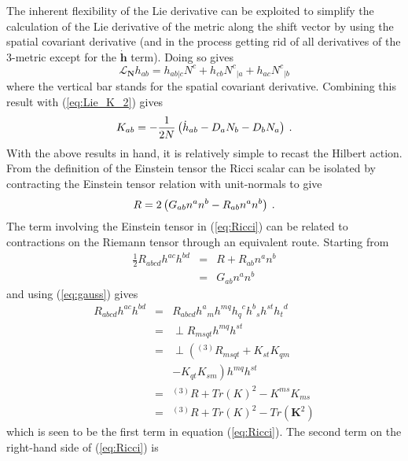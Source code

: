 The inherent flexibility of the Lie derivative can be exploited to simplify the
calculation of the Lie derivative of the metric along the shift vector by
using the spatial covariant derivative (and in the process getting rid of all
derivatives of the 3-metric except for the $\mathbf{\dot h}$ term).
Doing so gives
\[
   {\mathcal L}_{\mathbf{N}} h_{ab} = h_{ab|c} N^c + h_{cb} {N^{c}}_{|a}
                                                  + h_{ac} {N^{c}}_{|b}
\]
where the vertical bar stands for the spatial covariant derivative.  Combining
this result with (\ref{eq:Lie_K_2}) gives
\[
   K_{ab} = -\frac{1}{2 N} \left( {\dot h}_{ab} - D_{a} N_{b} - D_{b} N_{a} \right) \: .
\]
With the above results in hand, it is relatively simple to recast the Hilbert
action.  From the definition of the Einstein tensor the Ricci scalar can be
isolated by contracting the Einstein tensor relation with unit-normals to give
\begin{equation}\label{eq:Ricci}
   R = 2 \left( G_{ab}n^an^b - R_{ab} n^a n^b \right) \: .
\end{equation}
The term involving the Einstein tensor in (\ref{eq:Ricci}) can be related to
contractions on the Riemann tensor through an equivalent route.  Starting from
\begin{eqnarray*}
   \frac{1}{2} R_{abcd} h^{ac} h^{bd} & = & R + R_{ab} n^a n^b \nonumber \\
                                      & = & G_{ab} n^a n^b
\end{eqnarray*}
and using (\ref{eq:gauss}) gives
\begin{eqnarray*}
   R_{abcd} h^{ac} h^{bd} & = & R_{abcd}{h^a}_m h^{mq} {h_q}^c {h^b}_s h^{st} {h_t}^d \nonumber \\
                          & = & \perp R_{msqt} h^{mq} h^{st} \nonumber \\
                          & = & \perp \left( {}^{(3)}R_{msqt} + K_{st}K_{qm} \right. \nonumber \\
                          &   & \left. - K_{qt}K_{sm} \right) h^{mq} h^{st} \nonumber \\
                          & = & {}^{(3)}R + {Tr(K)}^2 - K^{ms}K_{ms} \nonumber \\
                          & = & {}^{(3)}R + {Tr(K)}^2 - Tr({\mathbf K}^2)
\end{eqnarray*}
which is seen to be the first term in equation (\ref{eq:Ricci}).
The second term on the right-hand side of
(\ref{eq:Ricci}) is
